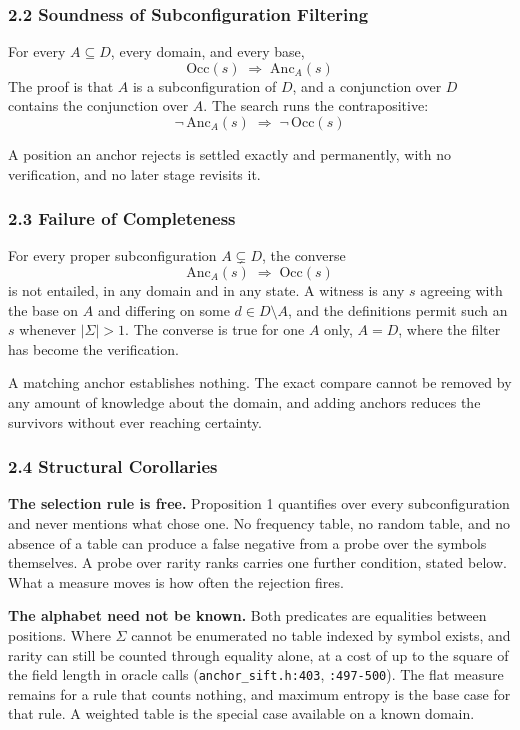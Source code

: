 \subsubsection{2.2 Soundness of Subconfiguration Filtering}

For every \(A \subseteq D\), every domain, and every base,
\[
  \mathrm{Occ}(s) \;\Longrightarrow\; \mathrm{Anc}_A(s)
\]
The proof is that \(A\) is a subconfiguration of \(D\), and a conjunction over \(D\) contains the conjunction over \(A\). The search runs the contrapositive:
\[
  \neg\,\mathrm{Anc}_A(s) \;\Longrightarrow\; \neg\,\mathrm{Occ}(s)
\]

A position an anchor rejects is settled exactly and permanently, with no verification, and no later stage revisits it.

\subsubsection{2.3 Failure of Completeness}

For every proper subconfiguration \(A \subsetneq D\), the converse
\[
  \mathrm{Anc}_A(s) \;\Longrightarrow\; \mathrm{Occ}(s)
\]
is not entailed, in any domain and in any state. A witness is any \(s\) agreeing with the base on \(A\) and differing on some \(d \in D \setminus A\), and the definitions permit such an \(s\) whenever \(|\Sigma| > 1\). The converse is true for one \(A\) only, \(A = D\), where the filter has become the verification.

A matching anchor establishes nothing. The exact compare cannot be removed by any amount of knowledge about the domain, and adding anchors reduces the survivors without ever reaching certainty.

\subsubsection{2.4 Structural Corollaries}

\noindent\textbf{The selection rule is free.} Proposition 1 quantifies over every subconfiguration and never mentions what chose one. No frequency table, no random table, and no absence of a table can produce a false negative from a probe over the symbols themselves. A probe over rarity ranks carries one further condition, stated below. What a measure moves is how often the rejection fires.

\noindent\textbf{The alphabet need not be known.} Both predicates are equalities between positions. Where \(\Sigma\) cannot be enumerated no table indexed by symbol exists, and rarity can still be counted through equality alone, at a cost of up to the square of the field length in oracle calls (\texttt{anchor\_sift.h:403}, \texttt{:497-500}). The flat measure remains for a rule that counts nothing, and maximum entropy is the base case for that rule. A weighted table is the special case available on a known domain.

